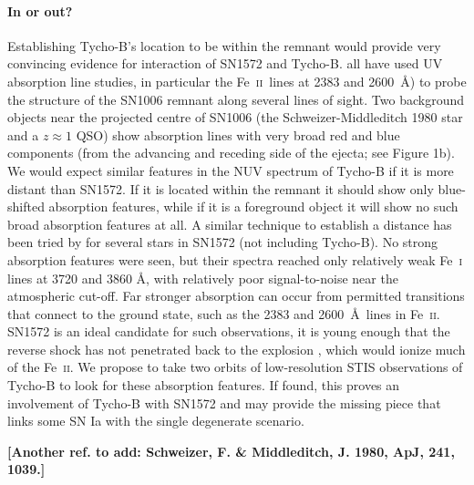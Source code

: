 \documentclass[12pt]{article}
\newcommand{\feii}{Fe~\textsc{ii}}
\begin{document}
\paragraph{In or out?}
Establishing Tycho-B's location to be within the remnant would provide very convincing evidence for interaction of SN1572 and Tycho-B. 
\cite{1988ApJ...327..164F,1993ApJ...416..247W, 2005ApJ...624..189W} all have used UV absorption line studies, in particular the \feii\ lines at 2383 and 2600~\AA) to probe the structure of the SN1006 remnant along several lines of sight. Two background objects near the projected centre of SN1006  (the Schweizer-Middleditch 1980 star and a $z \approx 1$ QSO) show absorption lines with very broad red and blue components (from the advancing and receding side of the ejecta; see Figure 1b).  We would expect similar features in the NUV spectrum of Tycho-B if it is more distant than SN1572.   If it is located  within the remnant it should  show only blue-shifted absorption features, while if it is a foreground object it will show no such broad absorption features at all. A similar technique to establish a distance has been tried by \citet{2007PASJ...59..811I} for  several stars in SN1572 (not including Tycho-B).  No strong absorption features were seen, but their spectra reached only relatively weak Fe~\textsc{i} lines at 3720 and 3860 \AA, with relatively poor signal-to-noise near the atmospheric cut-off.  
 Far stronger absorption can occur  from permitted transitions that connect to the ground state, such as the 2383 and 2600~\AA\ lines in \feii.  
SN1572 is an ideal candidate for such observations, it is young enough that the reverse shock has not penetrated back to the explosion \citep[current radius 183\arcsec;][]{2005ApJ...634..376W}, which would  ionize much of the \feii. We propose to take two orbits of low-resolution STIS observations of Tycho-B to look for these absorption features. If found,  this proves an involvement of Tycho-B with SN1572 and may provide the missing piece that links some SN Ia with the single degenerate scenario.

{\bf[Another ref. to add:  Schweizer, F. \& Middleditch, J. 1980, ApJ, 241, 1039.]}
\end{document}
